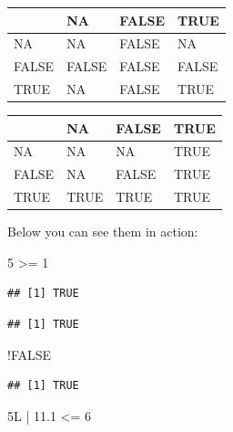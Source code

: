 \documentclass[]{book}
\newenvironment{Shaded}{\begin{snugshade}}{\end{snugshade}}
\newcommand{\DecValTok}[1]{\textcolor[rgb]{0.69,0.50,0.00}{#1}}
\newcommand{\FloatTok}[1]{\textcolor[rgb]{0.69,0.50,0.00}{#1}}
\newcommand{\StringTok}[1]{\textcolor[rgb]{0.75,0.01,0.01}{#1}}
\newcommand{\OtherTok}[1]{\textcolor[rgb]{0.00,0.43,0.16}{#1}}
\newcommand{\OperatorTok}[1]{\textcolor[rgb]{0.12,0.11,0.11}{#1}}
\newcommand{\NormalTok}[1]{\textcolor[rgb]{0.12,0.11,0.11}{#1}}
\theoremstyle{definition}
\theoremstyle{definition}
\theoremstyle{definition}
\theoremstyle{remark}
\begin{document}
\begin{table}

\begin{longtable}[t]{llll}
\toprule
  & NA & FALSE & TRUE\\
\midrule
NA & NA & FALSE & NA\\
FALSE & FALSE & FALSE & FALSE\\
TRUE & NA & FALSE & TRUE\\
\bottomrule
\end{longtable}
\begin{longtable}[t]{llll}
\toprule
  & NA & FALSE & TRUE\\
\midrule
NA & NA & NA & TRUE\\
FALSE & NA & FALSE & TRUE\\
TRUE & TRUE & TRUE & TRUE\\
\bottomrule
\end{longtable}
\end{table}

Below you can see them in action:

\begin{Shaded}
\begin{Highlighting}[]
\DecValTok{5} \OperatorTok{>=}\StringTok{ }\DecValTok{1}
\end{Highlighting}
\end{Shaded}

\begin{verbatim}
## [1] TRUE
\end{verbatim}

\begin{Shaded}
\end{Shaded}

\begin{verbatim}
## [1] TRUE
\end{verbatim}

\begin{Shaded}
\begin{Highlighting}[]
\OperatorTok{!}\OtherTok{FALSE}
\end{Highlighting}
\end{Shaded}

\begin{verbatim}
## [1] TRUE
\end{verbatim}

\begin{Shaded}
\begin{Highlighting}[]
\NormalTok{5L }\OperatorTok{|}\StringTok{ }\FloatTok{11.1} \OperatorTok{<=}\StringTok{ }\DecValTok{6}
\end{Highlighting}
\end{Shaded}
\end{document}
